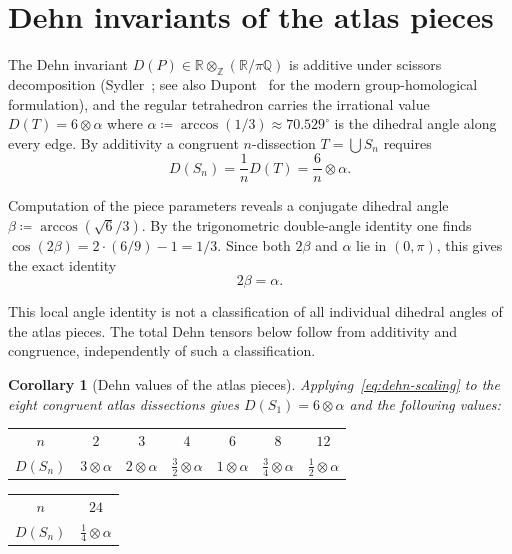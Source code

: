 \documentclass[11pt,a4paper]{article}
\theoremstyle{plain}
\newtheorem{corollary}[corollary]{Corollary}
\theoremstyle{definition}
\theoremstyle{remark}
\newcommand{\Q}{\mathbb{Q}}
\newcommand{\R}{\mathbb{R}}
\newcommand{\Z}{\mathbb{Z}}
\begin{document}
\section{Dehn invariants of the atlas pieces}\label{sec:dehn}

The Dehn invariant $D(P) \in \R \otimes_{\Z} (\R/\pi\Q)$ is additive under
scissors decomposition (Sydler~\cite{Sydler1965}; see also
Dupont~\cite{Dupont2001} for the modern group-homological
formulation), and the regular tetrahedron carries the irrational
value $D(T) = 6 \otimes \alpha$ where
$\alpha \coloneqq \arccos(1/3) \approx 70.529^{\circ}$ is the dihedral angle
along every edge.  By additivity a congruent $n$-dissection $T = \bigcup S_{n}$
requires
\begin{equation}\label{eq:dehn-scaling}
  D(S_{n}) = \frac{1}{n} D(T) = \frac{6}{n}\otimes\alpha .
\end{equation}

Computation of the piece parameters reveals a conjugate dihedral angle
$\beta \coloneqq \arccos(\sqrt{6}/3)$.  By the trigonometric double-angle
identity one finds $\cos(2\beta) = 2 \cdot (6/9) - 1 = 1/3$.  Since both
$2\beta$ and $\alpha$ lie in $(0,\pi)$, this gives the exact identity
\begin{equation}\label{eq:2beta-alpha}
  2\beta = \alpha.
\end{equation}

This local angle identity is not a classification of all individual
dihedral angles of the atlas pieces.  The total Dehn tensors below follow
from additivity and congruence, independently of such a classification.

\begin{corollary}[Dehn values of the atlas pieces]\label{thm:dehn-values}
Applying~\eqref{eq:dehn-scaling} to the eight congruent atlas dissections
gives $D(S_1)=6\otimes\alpha$ and the following values:
\begin{center}\small
\begin{tabular}{@{}ccccccc@{}}
\toprule
$n$ & $2$ & $3$ & $4$ & $6$ & $8$ & $12$ \\[2pt]
$D(S_{n})$ & $3\otimes\alpha$ & $2\otimes\alpha$ & $\tfrac{3}{2}\otimes\alpha$ &
$1\otimes\alpha$ & $\tfrac34\otimes\alpha$ & $\tfrac12\otimes\alpha$ \\
\bottomrule
\end{tabular}
\quad
\begin{tabular}{@{}cc@{}}
\toprule
$n$ & $24$ \\[2pt]
$D(S_{n})$ & $\tfrac14\otimes\alpha$ \\
\bottomrule
\end{tabular}
\end{center}
\end{corollary}
\end{document}

